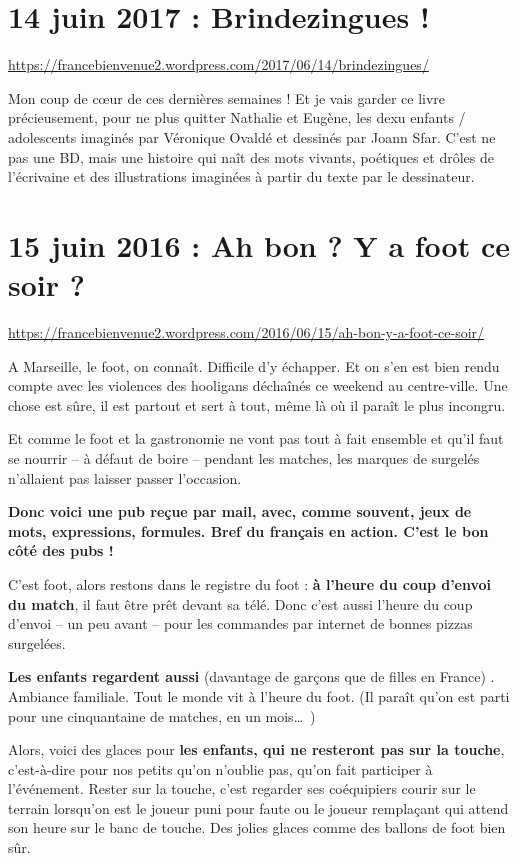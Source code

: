 \documentclass[11pt, french]{report}
\begin{document}
\chapter{14 juin 2017 : Brindezingues !}

\url{https://francebienvenue2.wordpress.com/2017/06/14/brindezingues/}

\vfill

Mon coup de cœur de ces dernières semaines ! Et je vais garder ce livre précieusement, pour ne
plus quitter Nathalie et Eugène, les dexu enfants / adolescents imaginés par Véronique Ovaldé
et dessinés par Joann Sfar. C'est ne pas une BD, mais une histoire qui naît des mots vivants,
poétiques et drôles de l'écrivaine et des illustrations imaginées à partir du texte par le
dessinateur.

\chapter{15 juin 2016 : Ah bon ? Y a foot ce soir ?}

\url{https://francebienvenue2.wordpress.com/2016/06/15/ah-bon-y-a-foot-ce-soir/}

\vfill

A Marseille, le foot, on connaît. Difficile d’y échapper. Et on s’en est bien
rendu compte avec les violences des hooligans déchaînés ce weekend au centre-ville.
Une chose est sûre, il est partout et sert à tout, même là où il paraît le plus
incongru.

Et comme le foot et la gastronomie ne vont pas tout à fait ensemble et qu’il faut
se nourrir – à défaut de boire – pendant les matches, les marques de surgelés
n’allaient pas laisser passer l’occasion.

\textbf{Donc voici une pub reçue par mail, avec, comme souvent, jeux de mots, expressions,
  formules. Bref du français en action. C’est le bon côté des pubs !}

C’est foot, alors restons dans le registre du foot : \textbf{à l’heure du coup d’envoi du
  match}, il faut être prêt devant sa télé. Donc c’est aussi l’heure du coup
d’envoi – un peu avant – pour les commandes par internet de bonnes pizzas
surgelées.

\textbf{Les enfants regardent aussi} (davantage de garçons que de filles en France) .
Ambiance familiale. Tout le monde vit à l’heure du foot. (Il paraît qu’on est
parti pour une cinquantaine de matches, en un mois\ldots\ )

Alors, voici des glaces pour \textbf{les enfants, qui ne resteront pas sur la touche},
c’est-à-dire pour nos petits qu’on n’oublie pas, qu’on fait participer à
l’événement. Rester sur la touche, c’est regarder ses coéquipiers courir sur le
terrain lorsqu’on est le joueur puni pour faute ou le joueur remplaçant qui attend
son heure sur le banc de touche. Des jolies glaces comme des ballons de foot bien
sûr.
\end{document}
